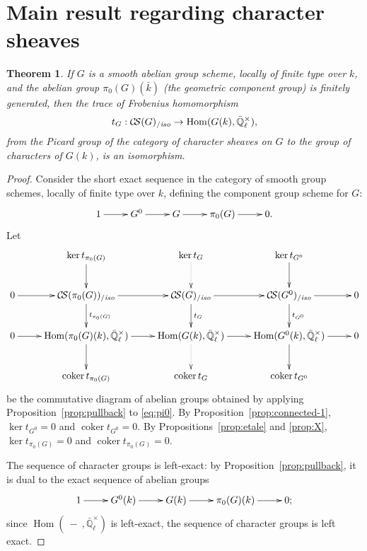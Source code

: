 \documentclass[11pt]{amsart}
\theoremstyle{plain}
\newtheorem{theorem}{Theorem}[section]
\theoremstyle{definition}
\theoremstyle{remark}
\newcommand{\EE}{\mathbb{\bar Q}_\ell}
\newcommand{\bFq}{\bar{k}}
\newcommand{\Fq}{k}
\DeclareMathOperator{\Hom}{Hom}
\DeclareMathOperator{\coker}{coker}
\newcommand{\CS}{{\mathcal{C\hskip-1.8pt S}}}
\newcommand{\CSiso}[1]{\CS(#1)_{/\textit{iso}}}
\begin{document}
\section{Main result regarding character sheaves}

%
\begin{theorem}\label{thm:snake}
  If $G$ is a smooth abelian group scheme, locally of finite type over
  $\Fq$, and the abelian group $\pi_0(G)(\bFq)$ (the geometric
  component group) is finitely generated, then the trace of Frobenius
  homomorphism
  \[
  t_{G} : \CSiso{G} \to \Hom(G(\Fq),\EE^\times),
  \]
  from the Picard group of the category of character sheaves on $G$ to
  the group of characters of $G(\Fq)$, is an isomorphism.
\end{theorem}

\begin{proof}
  Consider the short exact sequence in the category of smooth group
  schemes, locally of finite type over $\Fq$, defining the component
  group scheme for $G$:
  \begin{equation}\label{eq:pi0}
    \xymatrix{
      1 \ar[r] & G^0 \ar[r] & G \ar[r] & \pi_0(G) \ar[r] & 0.
      }
  \end{equation}
  Let
  \[
  \xymatrix{
    & \ar[d] \ker t_{\pi_0(G)} & \ar@{.>}[d] \ker t_{G} & \ar[d] \ker t_{G^0} & \\
    0\ar[r] & \ar[d]^{t_{\pi_0(G)}} \CSiso{\pi_0(G)} \ar[r]
    & \ar[d]^{t_{G}} \CSiso{G} \ar[r] & \ar[d]^{t_{G^0}} \CSiso{G^0} \ar[r] & 0\\
    0 \ar[r] & \ar[d] \Hom(\pi_0(G)(\Fq),\EE^\times) \ar[r]
    & \ar@{.>}[d] \Hom(G(\Fq),\EE^\times) \ar[r] & \ar[d] \Hom(G^0(\Fq),\EE^\times) \ar[r] & 0\\
    & \coker t_{\pi_0(G)} & \coker t_{G} &  \coker t_{G^0} & \\
    }
  \]
  be the commutative diagram of abelian groups obtained by applying
  Proposition~\ref{prop:pullback} to \eqref{eq:pi0}.  By
  Proposition~\ref{prop:connected-1}, $\ker t_{G^0} =0$ and $\coker t_{G^0}=0$.
  By Propositions~\ref{prop:etale} and \ref{prop:X}, $\ker t_{\pi_0(G)}=0$
  and $\coker t_{\pi_0(G)}=0$.

  The sequence of character groups is left-exact: by
  Proposition~\ref{prop:pullback}, it is dual to the exact sequence of
  abelian groups
  \begin{equation}\label{eq:pi0}
    \xymatrix{
      1 \ar[r] & G^0(\Fq) \ar[r] & G(\Fq) \ar[r] & \pi_0(G)(\Fq) \ar[r] & 0;
    }
  \end{equation}
  since $\Hom(\ - \ ,\EE^\times)$ is left-exact, the sequence of
  character groups is left exact.


\end{proof}
\end{document}
